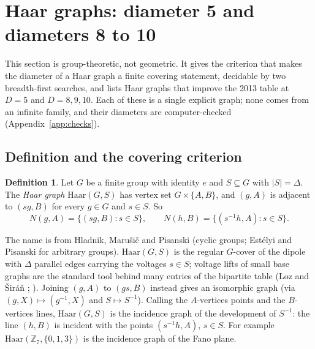 \documentclass[11pt]{amsart}
\theoremstyle{definition}
\newtheorem{definition}[theorem]{Definition}
\theoremstyle{remark}
\numberwithin{equation}{section}
\newcommand{\Z}{\mathbb Z}
\begin{document}
\section{Haar graphs: diameter 5 and diameters 8 to 10}\label{sec:haar}

This section is group-theoretic, not geometric. It gives the criterion that makes the diameter of a Haar graph a finite
covering statement, decidable by two breadth-first searches, and lists Haar graphs that improve the 2013 table at $D=5$ and
$D=8,9,10$. Each of these is a single explicit graph; none comes from an infinite family, and their diameters are
computer-checked (Appendix~\ref{app:checks}).

\subsection{Definition and the covering criterion}

\begin{definition}\label{def:haar}
Let $G$ be a finite group with identity $e$ and $S\subseteq G$ with $|S|=\Delta$. The \emph{Haar graph} $\mathrm{Haar}(G,S)$ has vertex set
$G\times\{A,B\}$, and $(g,A)$ is adjacent to $(sg,B)$ for every $g\in G$ and $s\in S$. So
\[
N(g,A)=\{(sg,B):s\in S\},\qquad N(h,B)=\{(s^{-1}h,A):s\in S\}.
\]
\end{definition}

The name is from Hladnik, Maru\v{s}i\v{c} and Pisanski \cite{HMP02} (cyclic groups; Est\'elyi and Pisanski \cite{EP16} for
arbitrary groups). $\mathrm{Haar}(G,S)$ is the regular $G$-cover of the dipole with $\Delta$ parallel edges carrying the voltages $s\in S$;
voltage lifts of small base graphs are the standard tool behind many entries of the bipartite table (Loz and \v{S}ir\'a\v{n}
\cite{LS08}; \cite[\S3.4.5]{MS13}). Joining $(g,A)$ to $(gs,B)$ instead gives an isomorphic graph (via $(g,X)\mapsto
(g^{-1},X)$ and $S\mapsto S^{-1}$). Calling the $A$-vertices points and the $B$-vertices lines, $\mathrm{Haar}(G,S)$ is the incidence graph
of the development of $S^{-1}$: the line $(h,B)$ is incident with the points $(s^{-1}h,A)$, $s\in S$. For example $\mathrm{Haar}(\Z_7,\{0,1,3\})$
is the incidence graph of the Fano plane.
\end{document}

